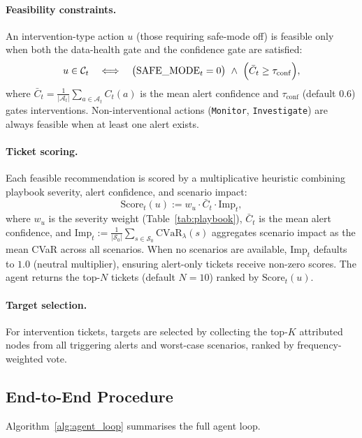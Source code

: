 \paragraph{Feasibility constraints.}
An intervention-type action $u$ (those requiring safe-mode off) is feasible only when both the data-health gate and the confidence gate are satisfied:
\begin{equation}
\label{eq:decision_constraints}
u \in \mathcal{C}_t
\quad \Longleftrightarrow \quad
\bigl(\mathrm{SAFE\_MODE}_t=0\bigr)\ \wedge\
\Bigl(\bar{C}_t \ge \tau_{\mathrm{conf}}\Bigr),
\end{equation}
where $\bar{C}_t = \frac{1}{|\mathcal{A}_t|}\sum_{a\in\mathcal{A}_t} C_t(a)$ is the mean alert confidence and $\tau_{\mathrm{conf}}$ (default $0.6$) gates interventions. Non-interventional actions (\texttt{Monitor}, \texttt{Investigate}) are always feasible when at least one alert exists.

\paragraph{Ticket scoring.}
Each feasible recommendation is scored by a multiplicative heuristic combining playbook severity, alert confidence, and scenario impact:
\begin{equation}
\label{eq:ticket_score}
\mathrm{Score}_t(u) :=
w_u \cdot \bar{C}_t \cdot \mathrm{Imp}_t,
\end{equation}
where $w_u$ is the severity weight (Table~\ref{tab:playbook}), $\bar{C}_t$ is the mean alert confidence, and $\mathrm{Imp}_t := \frac{1}{|\mathcal{S}_0|}\sum_{s\in\mathcal{S}_0} \mathrm{CVaR}_\lambda(s)$ aggregates scenario impact as the mean CVaR across all scenarios. When no scenarios are available, $\mathrm{Imp}_t$ defaults to $1.0$ (neutral multiplier), ensuring alert-only tickets receive non-zero scores. The agent returns the top-$N$ tickets (default $N=10$) ranked by $\mathrm{Score}_t(u)$.

\paragraph{Target selection.}
For intervention tickets, targets are selected by collecting the top-$K$ attributed nodes from all triggering alerts and worst-case scenarios, ranked by frequency-weighted vote.

\subsection{End-to-End Procedure}
Algorithm~\ref{alg:agent_loop} summarises the full agent loop.

